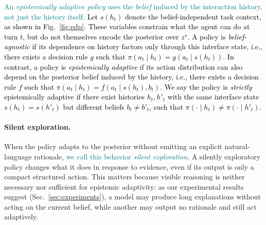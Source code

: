 \documentclass[11pt]{article}
\newcommand{\an}[1]{\textcolor{black}{#1}}
\newcommand{\nk}[1]{\textcolor{teal}{#1}}
\theoremstyle{plain}
\theoremstyle{definition}
\theoremstyle{remark}
\begin{document}
\an{\nk{An {\it epistemically adaptive policy} uses the {\it belief} induced by the interaction history, not just the history itself.} Let \(s(h_t)\) denote the belief-independent task context, as shown in Fig.~\ref{fig:edp}. These variables constrain what the agent can do at turn \(t\), but do not themselves encode the posterior over \(z^\star\). A policy is \emph{belief-agnostic} if its dependence on history factors only through this interface state, i.e., there exists a decision rule \(g\) such that \(\pi(a_t\mid h_t)=g(a_t\mid s(h_t))\). In contrast, a policy is \emph{epistemically adaptive} if its action distribution can also depend on the posterior belief induced by the history, i.e., there exists a decision rule \(f\) such that \(\pi(a_t\mid h_t)=f(a_t\mid s(h_t),b_t)\). We say the policy is \emph{strictly} epistemically adaptive if there exist histories \(h_t,h'_t\) with the same interface state \(s(h_t)=s(h'_t)\) but different beliefs \(b_t\neq b'_t\), such that \(\pi(\cdot\mid h_t)\neq\pi(\cdot\mid h'_t)\).}
 
 


\begin{theorybox}
    

\paragraph{Silent exploration.}
When the policy adapts to the posterior without emitting an explicit natural-language rationale, \nk{we call this behavior \emph{silent exploration}}. A silently exploratory policy changes what it does in response to evidence, even if its output is only a compact structured action. This matters because visible reasoning is neither necessary nor sufficient for epistemic adaptivity: as our experimental results suggest (Sec.~\ref{sec:experiments}), a model may produce long explanations without acting on the current belief, while another may output no rationale and still act adaptively.

\end{theorybox}
\end{document}
